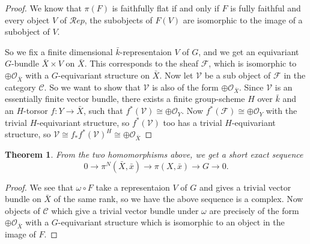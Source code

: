 \documentclass{article}
\newcommand{\cat}{\mathcal C} %
\newtheorem{theorem}{Theorem}
\begin{document}
\begin{proof}
  We know that $\pi(F)$ is faithfully flat if and only if $F$ is fully faithful and every object $V$ of 
  $\mathcal Rep$, the subobjects of $F(V)$ are isomorphic to the image of a subobject of $V$.

  So we fix a finite dimensional $\bar k$-representaion $V$ of $G$, and we get an equivariant $G$-bundle 
  $\bar X \times V$ on $\bar X$. This corresponds to the sheaf $\mathcal F$, which is isomorphic to 
  $\oplus \mathcal O_{\bar X}$ with a $G$-equivariant structure on $\bar X$. Now let $\mathcal V$ be a sub object of 
  $\mathcal F$ in the category $\cat$. So we want to show that $\mathcal V$ is also of the form 
  $\oplus \mathcal O_{\bar X}$. Since $\mathcal V$ is an essentially finite vector bundle, there exists a 
  finite group-scheme $H$ over $\bar k$ and an $H$-torsor $f:Y \rightarrow \bar X$, such that 
  $f^*(\mathcal V) \cong \oplus \mathcal O_Y$. Now $f^*(\mathcal F) \cong \oplus \mathcal O_Y$ with the trivial
  $H$-equivariant structure, so $f^*(\mathcal V)$ too has a trivial $H$-equivariant structure, so 
  $\mathcal V \cong f_*f^*(\mathcal V) ^H \cong \oplus \mathcal O_{\bar X}$
\end{proof}

\begin{theorem}
  From the two homomorphisms above, we get a short exact sequence
  $$0 \rightarrow \pi ^ N(\bar X,\bar x) \rightarrow \pi(X,\bar x) \rightarrow G \rightarrow 0.$$
\end{theorem}

\begin{proof}
  We see that $\omega \circ F$ take a representaion $V$ of $G$ and gives a trivial vector bundle on $\bar X$ of the
  same rank, so we have the above sequence is a complex. Now objects of $\cat$ which give a trivial vector bundle 
  under $\omega$ are precisely of the form $\oplus \mathcal O_{\bar X}$ with a $G$-equivariant structure which is 
  isomorphic to an object in the image of $F$.
\end{proof}
\end{document}
